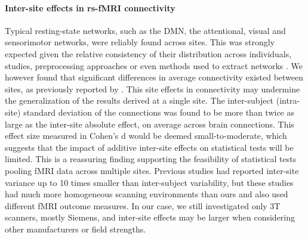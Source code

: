 \documentclass[authoryear]{elsarticle}
\begin{document}
\paragraph{Inter-site effects in rs-fMRI connectivity} Typical resting-state networks, such as the DMN, the attentional, visual and sensorimotor networks, were reliably found across sites. This was strongly expected given the relative consistency of their distribution across individuals, studies, preprocessing approaches or even methods used to extract networks \citep[e.g.][]{Damoiseaux2006,Heuvel2008,Bellec2010c,Yeo2011,Power2011}. We however found that significant differences
in average connectivity existed between sites, as previously
reported by \cite{Yan2013a}. This site effects in connectivity may undermine the
generalization of the results derived at a single site. The inter-subject
(intra-site) standard deviation of the connections was found to be more than
twice as large as the inter-site absolute effect, on average across brain connections. This effect size measured in Cohen's d would be deemed small-to-moderate, which suggests that the impact of additive inter-site effects on statistical tests will be limited. This is a reassuring finding supporting the feasibility of statistical tests pooling fMRI data across multiple sites. Previous studies \citep{Sutton2008,Brown2011} had reported inter-site variance up to 10 times smaller than inter-subject variability, but these studies had much more homogeneous scanning environments than ours and also used different fMRI outcome measures. In our case, we still investigated only 3T scanners, mostly Siemens, and inter-site effects may be larger when considering other manufacturers or field strengths.\\

\end{document}
